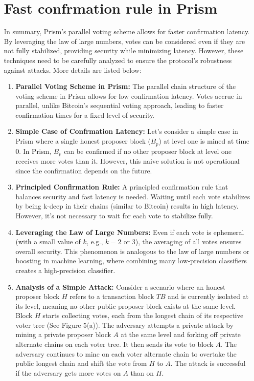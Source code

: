 \documentclass{report}
\begin{document}
\section{Fast confrmation rule in Prism}
In summary, Prism's parallel voting scheme allows for faster confirmation latency. By leveraging the law of large numbers, votes can be considered even if they are not fully stabilized, providing security while minimizing latency. However, these techniques need to be carefully analyzed to ensure the protocol's robustness against attacks. More details are listed below:
\begin{enumerate}
	\item \textbf{Parallel Voting Scheme in Prism:} The parallel chain structure of the voting scheme in Prism allows for low confirmation latency. Votes accrue in parallel, unlike Bitcoin's sequential voting approach, leading to faster confirmation times for a fixed level of security.
	\item \textbf{Simple Case of Confrmation Latency:} Let's consider a simple case in Prism where a single honest proposer block ($B_{p}$) at level one is mined at time $0$. In Prism, $B_{p}$ can be confirmed if no other proposer block at level one receives more votes than it. However, this naive solution is not operational since the confirmation depends on the future.
	\item \textbf{Principled Confirmation Rule:} A principled confirmation rule that balances security and fast latency is needed. Waiting until each vote stabilizes by being k-deep in their chains (similar to Bitcoin) results in high latency. However, it's not necessary to wait for each vote to stabilize fully.
	\item \textbf{Leveraging the Law of Large Numbers:} Even if each vote is ephemeral (with a small value of $k$, e.g., $k = 2$ or $3$), the averaging of all votes ensures overall security. This phenomenon is analogous to the law of large numbers or boosting in machine learning, where combining many low-precision classifiers creates a high-precision classifier.
	\item \textbf{Analysis of a Simple Attack:} Consider a scenario where an honest proposer block $H$ refers to a transaction block $TB$ and is currently isolated at its level, meaning no other public proposer block exists at the same level. Block $H$ starts collecting votes, each from the longest chain of its respective voter tree (See Figure 5(a)). The adversary attempts a private attack by mining a private proposer block $A$ at the same level and forking off private alternate chains on each voter tree. It then sends its vote to block $A$. The adversary continues to mine on each voter alternate chain to overtake the public longest chain and shift the vote from $H$ to $A$. The attack is successful if the adversary gets more votes on $A$ than on $H$.
\end{enumerate}
\end{document}
